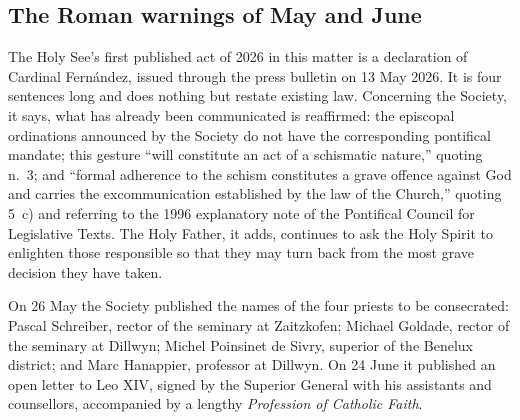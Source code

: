 \subsection{The Roman warnings of May and June}

The Holy See's first published act of 2026 in this matter is a
declaration of Cardinal Fernández, issued through the press bulletin on
13 May 2026. It is four sentences long and does nothing but restate
existing law. Concerning the Society, it says, what has already been
communicated is reaffirmed: the episcopal ordinations announced by the
Society do not have the corresponding pontifical mandate; this gesture
``will constitute an act of a schismatic nature,'' quoting  n.~3; and ``formal adherence to the schism constitutes a grave
offence against God and carries the excommunication established by the
law of the Church,'' quoting  5~c) and referring to
the 1996 explanatory note of the Pontifical Council for Legislative
Texts. The Holy Father, it adds, continues to ask the Holy Spirit to
enlighten those responsible so that they may turn back from the most
grave decision they have taken.

On 26 May the Society published the names of the four priests to be
consecrated: Pascal Schreiber, rector of the seminary at Zaitzkofen;
Michael Goldade, rector of the seminary at Dillwyn; Michel Poinsinet de
Sivry, superior of the Benelux district; and Marc Hanappier, professor at
Dillwyn. On 24 June it published an open letter to Leo XIV, signed by the
Superior General with his assistants and counsellors, accompanied by a
lengthy \textit{Profession of Catholic Faith}.

